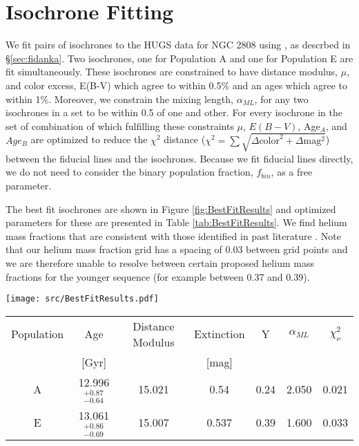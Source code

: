 \section{Isochrone Fitting}\label{sec:isoFit}
We fit pairs of isochrones to the HUGS data for NGC 2808 using \fidanka, as
descrbed in \S \ref{sec:fidanka}. Two isochrones, one for Population A and one
for Population E are fit simultaneously. These isochrones are constrained to
have distance modulus, $\mu$, and color excess, E(B-V) which agree to within
0.5\% and an ages which agree to within 1\%. Moreover, we constrain the mixing length, $\alpha_{ML}$, for any two
isochrones in a set to be within 0.5 of one and other. For every isochrone in
the set of combination of which fulfilling these constraints $\mu$, $E(B-V)$,
Age$_{A}$, and $Age_{B}$ are optimized to reduce the $\chi^{2}$ distance
($\chi^{2} = \sum\sqrt{\Delta \text{color}^{2} + \Delta \text{mag} ^{2}}$)
between the fiducial lines and the isochrones. Because we fit fiducial lines
directly, we do not need to consider the binary population fraction, $f_{bin}$,
as a free parameter.

The best fit isochrones are shown in Figure \ref{fig:BestFitResults} and
optimized parameters for these are presented in Table \ref{tab:BestFitResults}.
We find helium mass fractions that are consistent with those identified in past
literature \citep[e.g.][]{Milone2015}. Note that our helium mass fraction grid
has a spacing of 0.03 between grid points and we are therefore unable to
resolve between certain proposed helium mass fractions for the younger sequence
(for example between 0.37 and 0.39).

\begin{figure*}
  \centering
  \texttt{[image: src/BestFitResults.pdf]}
  \caption{Best fit isochrone results for NGC 2808. The best fit population A
  and E models are shown as black lines. The following 50 best fit models are
  presented as grey lines. The solid black line is fit to population A, while
  the dashed black line is fit to population E.}
  \label{fig:BestFitResults}
\end{figure*}

\begin{table*}
  \centering
  \begin{tabular}{c | c c c c c c}
    \hline
    Population & Age & Distance Modulus & Extinction & Y & $\alpha_{ML}$ & $\chi^{2}_{\nu}$\\
    & [Gyr] & & [mag] & & &\\
    \hline
    \hline
    A & 12.996$^{+0.87}_{-0.64}$ & 15.021 & 0.54 & 0.24 & 2.050 & 0.021\\
    E & 13.061$^{+0.86}_{-0.69}$ & 15.007 & 0.537 & 0.39 & 1.600 & 0.033 \\
    \hline
  \end{tabular}
  \caption{Best fit parameters derived from fitting isochrones to the fiducual lines derived from the NCG 2808 photometry. The one sigma uncertainty reported on population age were determined from the 16th and 84th percentiles of the distribution of best fit isochrones ages.}
  \label{tab:BestFitResults}
\end{table*}



